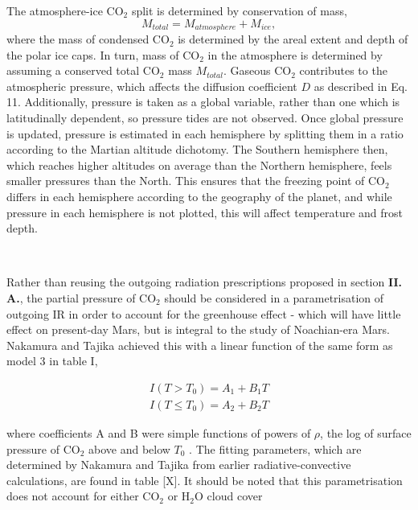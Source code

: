 \documentclass[12pt,onecolumn]{revtex4-2}    %
\begin{document}
The atmosphere-ice $\mathrm{CO_2}$ split is determined by conservation of mass, 
\begin{equation}
M_{total} = M_{atmosphere} + M_{ice},
\end{equation}
where the mass of condensed $\mathrm{CO_2}$ is determined by the areal extent and depth of the polar ice caps. In turn, mass of $\mathrm{CO_2}$ in the atmosphere is determined by assuming a conserved total $\mathrm{CO_2}$ mass $M_{total}$. Gaseous $\mathrm{CO_2}$ contributes to the atmospheric pressure, which affects the diffusion coefficient $D$ as described in Eq. 11. Additionally, pressure is taken as a global variable, rather than one which is latitudinally dependent, so pressure tides are not observed. Once global pressure is updated, pressure is estimated in each hemisphere by splitting them in a ratio according to the Martian altitude dichotomy. The Southern hemisphere then, which reaches higher altitudes on average than the Northern hemisphere, feels smaller pressures than the North. This ensures that the freezing point of $\mathrm{CO_2}$ differs in each hemisphere according to the geography of the planet, and while pressure in each hemisphere is not plotted, this will affect temperature and frost depth.

\

Rather than reusing the outgoing radiation prescriptions proposed in section \textbf{II. A.}, the partial pressure of $\mathrm{CO_2}$ should be considered in a parametrisation of outgoing IR in order to account for the greenhouse effect - which will have little effect on present-day Mars, but is integral to the study of Noachian-era Mars. Nakamura and Tajika achieved this with a linear function of the same form as model 3 in table I,

\begin{equation}
\begin{aligned}
I(T>T_{0}) = A_{1} + B_{1}T
\\
I(T \le T_{0}) = A_{2} + B_{2}T
\end{aligned}
\end{equation}

where coefficients A and B were simple functions of powers of $\rho$, the log of surface pressure of $\mathrm{CO_2}$ above and below $T_{0}$ \cite{NT01}. The fitting parameters, which are determined by Nakamura and Tajika from earlier radiative-convective calculations, are found in table [X]. It should be noted that this parametrisation does not account for either $\mathrm{CO_2}$ or $\mathrm{H_2 O}$ cloud cover
\end{document}
